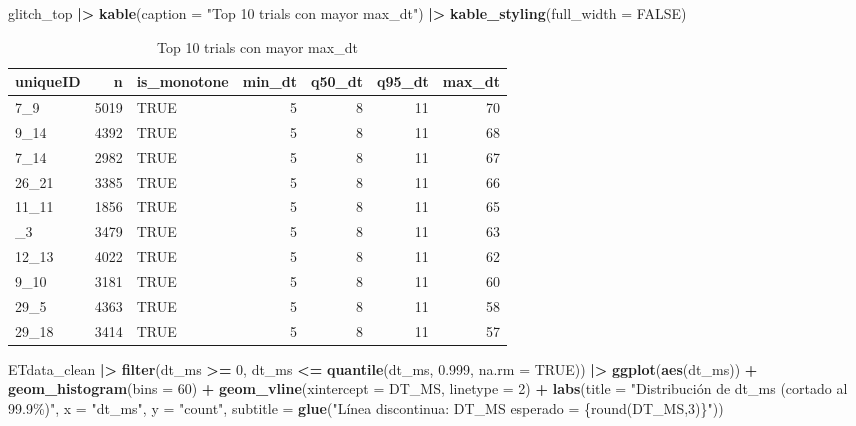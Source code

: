 \documentclass[
]{article}
\newenvironment{Shaded}{\begin{snugshade}}{\end{snugshade}}
\newcommand{\AttributeTok}[1]{\textcolor[rgb]{0.13,0.29,0.53}{#1}}
\newcommand{\ConstantTok}[1]{\textcolor[rgb]{0.56,0.35,0.01}{#1}}
\newcommand{\DecValTok}[1]{\textcolor[rgb]{0.00,0.00,0.81}{#1}}
\newcommand{\FloatTok}[1]{\textcolor[rgb]{0.00,0.00,0.81}{#1}}
\newcommand{\FunctionTok}[1]{\textcolor[rgb]{0.13,0.29,0.53}{\textbf{#1}}}
\newcommand{\NormalTok}[1]{#1}
\newcommand{\SpecialCharTok}[1]{\textcolor[rgb]{0.81,0.36,0.00}{\textbf{#1}}}
\newcommand{\StringTok}[1]{\textcolor[rgb]{0.31,0.60,0.02}{#1}}
\begin{document}
\begin{Shaded}
\begin{Highlighting}[]
\NormalTok{glitch\_top }\SpecialCharTok{|\textgreater{}}
  \FunctionTok{kable}\NormalTok{(}\AttributeTok{caption =} \StringTok{"Top 10 trials con mayor max\_dt"}\NormalTok{) }\SpecialCharTok{|\textgreater{}}
  \FunctionTok{kable\_styling}\NormalTok{(}\AttributeTok{full\_width =} \ConstantTok{FALSE}\NormalTok{)}
\end{Highlighting}
\end{Shaded}

\begin{longtable}[t]{lrlrrrr}
\caption{\label{tab:unnamed-chunk-2}Top 10 trials con mayor max_dt}\\
\toprule
uniqueID & n & is\_monotone & min\_dt & q50\_dt & q95\_dt & max\_dt\\
\midrule
7\_9 & 5019 & TRUE & 5 & 8 & 11 & 70\\
9\_14 & 4392 & TRUE & 5 & 8 & 11 & 68\\
7\_14 & 2982 & TRUE & 5 & 8 & 11 & 67\\
26\_21 & 3385 & TRUE & 5 & 8 & 11 & 66\\
11\_11 & 1856 & TRUE & 5 & 8 & 11 & 65\\
\addlinespace
18\_3 & 3479 & TRUE & 5 & 8 & 11 & 63\\
12\_13 & 4022 & TRUE & 5 & 8 & 11 & 62\\
9\_10 & 3181 & TRUE & 5 & 8 & 11 & 60\\
29\_5 & 4363 & TRUE & 5 & 8 & 11 & 58\\
29\_18 & 3414 & TRUE & 5 & 8 & 11 & 57\\
\bottomrule
\end{longtable}

\begin{Shaded}
\begin{Highlighting}[]
\NormalTok{ETdata\_clean }\SpecialCharTok{|\textgreater{}}
  \FunctionTok{filter}\NormalTok{(dt\_ms }\SpecialCharTok{\textgreater{}=} \DecValTok{0}\NormalTok{, dt\_ms }\SpecialCharTok{\textless{}=} \FunctionTok{quantile}\NormalTok{(dt\_ms, }\FloatTok{0.999}\NormalTok{, }\AttributeTok{na.rm =} \ConstantTok{TRUE}\NormalTok{)) }\SpecialCharTok{|\textgreater{}}
  \FunctionTok{ggplot}\NormalTok{(}\FunctionTok{aes}\NormalTok{(dt\_ms)) }\SpecialCharTok{+}
  \FunctionTok{geom\_histogram}\NormalTok{(}\AttributeTok{bins =} \DecValTok{60}\NormalTok{) }\SpecialCharTok{+}
  \FunctionTok{geom\_vline}\NormalTok{(}\AttributeTok{xintercept =}\NormalTok{ DT\_MS, }\AttributeTok{linetype =} \DecValTok{2}\NormalTok{) }\SpecialCharTok{+}
  \FunctionTok{labs}\NormalTok{(}\AttributeTok{title =} \StringTok{"Distribución de dt\_ms (cortado al 99.9\%)"}\NormalTok{,}
       \AttributeTok{x =} \StringTok{"dt\_ms"}\NormalTok{, }\AttributeTok{y =} \StringTok{"count"}\NormalTok{,}
       \AttributeTok{subtitle =} \FunctionTok{glue}\NormalTok{(}\StringTok{"Línea discontinua: DT\_MS esperado = \{round(DT\_MS,3)\}"}\NormalTok{))}
\end{Highlighting}
\end{Shaded}
\end{document}
